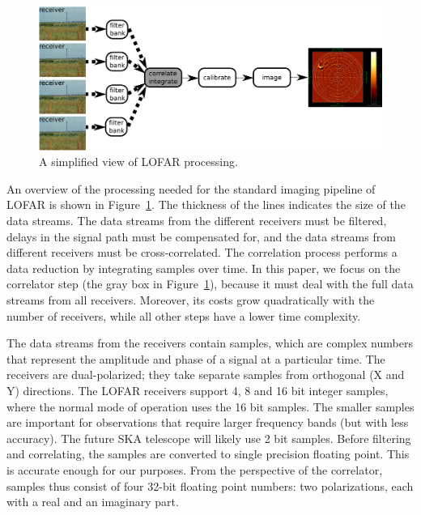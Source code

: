 \documentclass{article}
\begin{document}


\begin{figure}[t]
\begin{center}
\includegraphics[width=12cm]{figures/processing-overview.pdf}
\end{center}
\vspace{-0.5cm}
\caption{A simplified view of LOFAR processing.}
\label{fig-processing-overview}
\end{figure}

An overview of the processing needed for the standard imaging pipeline
of LOFAR is shown in Figure~\ref{fig-processing-overview}.  The
thickness of the lines indicates the size of the data streams.  The
data streams from the different receivers must be filtered, delays in
the signal path must be compensated for, and the data streams from
different receivers must be cross-correlated. The correlation process
performs a data reduction by integrating samples over time.  In this
paper, we focus on the correlator step (the gray box in
Figure~\ref{fig-processing-overview}), because it must deal with the full data streams
from all receivers. Moreover, its costs grow
quadratically with the number of receivers, while all other steps have a
lower time complexity.  

The data streams from the receivers contain samples, which are complex
numbers that represent the amplitude and phase of a signal at a
particular time.  The receivers are dual-polarized; they take separate
samples from orthogonal (X and Y) directions.  The LOFAR receivers
support 4, 8 and 16 bit integer samples, where the normal mode of
operation uses the 16 bit samples. The smaller samples are important
for observations that require larger frequency bands (but with less accuracy).
The future SKA telescope will
likely use 2 bit samples.  Before filtering and correlating, the
samples are converted to single precision floating point.  This is
accurate enough for our purposes. From the perspective of the
correlator, samples thus consist of four 32-bit floating point
numbers: two polarizations, each with a real and an imaginary part.
\end{document}
